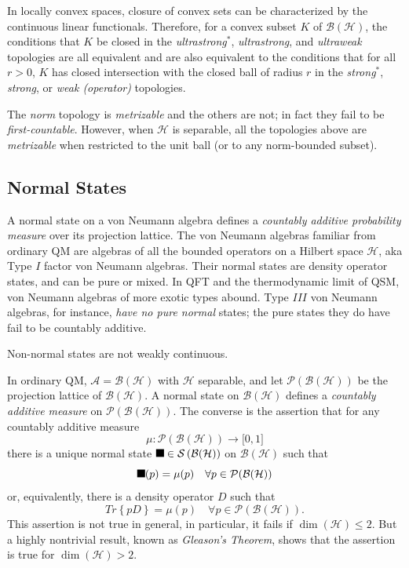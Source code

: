 \documentclass[aps,preprint]{revtex4}%
\providecommand{\U}[1]{\protect\rule{.1in}{.1in}}
\begin{document}
In locally convex spaces, closure of convex sets can be characterized by the
continuous linear functionals. Therefore, for a convex subset $K$ of
$\mathcal{B}(\mathcal{H})$, the conditions that $K$ be closed in the
\emph{ultrastrong}$^{\ast}$, \emph{ultrastrong}, and \emph{ultraweak}
topologies are all equivalent and are also equivalent to the conditions that
for all $r>0$, $K$ has closed intersection with the closed ball of radius $r$
in the \emph{strong}$^{\ast}$, \emph{strong}, or \emph{weak (operator)} topologies.

The \emph{norm} topology is \emph{metrizable} and the others are not; in fact
they fail to be \emph{first-countable}. However, when $\mathcal{H}$ is
separable, all the topologies above are \emph{metrizable} when restricted to
the unit ball (or to any norm-bounded subset).

\subsection{Normal States}

A normal state on a von Neumann algebra defines a \emph{countably additive
probability measure} over its projection lattice. The von Neumann algebras
familiar from ordinary QM are algebras of all the bounded operators on a
Hilbert space $\mathcal{H}$, aka Type $I$ factor von Neumann algebras. Their
normal states are density operator states, and can be pure or mixed. In QFT
and the thermodynamic limit of QSM, von Neumann algebras of more exotic types
abound. Type $III$ von Neumann algebras, for instance, \emph{have no pure
normal} states; the pure states they do have fail to be countably additive.

Non-normal states are not weakly continuous.

In ordinary QM, $\mathcal{A}=\mathcal{B}(\mathcal{H})$ with $\mathcal{H}$
separable, and let $\mathcal{P(B(H))}$ be the projection lattice of
$\mathcal{B(H)}$. A normal state on $\mathcal{B(H)}$ defines a \emph{countably
additive measure} on $\mathcal{P(B(H))}$. The converse is the assertion that
for any countably additive measure
\begin{equation}%
\mu
:\mathcal{P(B(H))}\rightarrow\lbrack0,1]
\end{equation}
there is a unique normal state $\U{3c9} \in\mathcal{S}\left(  \mathcal{B(H)}%
\right)  $ on $\mathcal{B(H)}$\emph{ }such that
\begin{equation}
\U{3c9} (p)=%
\mu
(p)\quad\forall p\in\mathcal{P(B(H))}%
\end{equation}
or, equivalently, there is a density operator $D$ such that
\begin{equation}
Tr\left\{  pD\right\}  =%
\mu
(p)\quad\forall p\in\mathcal{P(B(H))}.
\end{equation}
This assertion is not true in general, in particular, it fails if
$\dim(\mathcal{H})\leq2$. But a highly nontrivial result, known as
\emph{Gleason's Theorem}, shows that the assertion is true for $\dim
(\mathcal{H})>2$.
\end{document}
